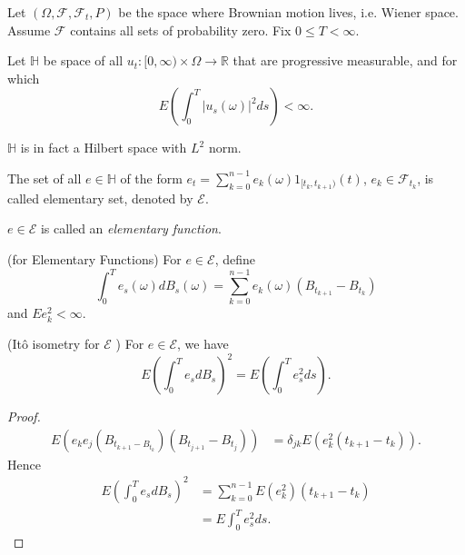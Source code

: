 \begin{definition}
	Let $(\Omega, \mathcal{F}, \mathcal{F}_t, P)$ be the space where Brownian motion lives, i.e. Wiener space. Assume $\mathcal{F}$ contains all sets of probability zero. Fix $0 \le  T < \infty $. 

	Let $\mathbb{H}$ be space of all $u_t : [0,\infty ) \times \Omega \to  \mathbb{R}$ that are progressive measurable, and for which
	\[
		E \left( \int _0^T |u_s(\omega)|^2 ds  \right) < \infty 
	.\] 
\end{definition}
$\mathbb{H}$ is in fact a Hilbert space with $L^2$ norm.

The set of all $e \in \mathbb{H}$ of the form $e_t = \sum_{k=0}^{n-1} e_k(\omega) 1_{[t_k, t_{k+1})}(t)$, $e_k \in \mathcal{F}_{t_k}$, is called elementary set, denoted by $\mathcal{E}$.

$e \in \mathcal{E}$ is called an \textit{elementary function}.

\begin{definition}(for Elementary Functions)
	For $e \in \mathcal{E}$, define
	\[
		\int _0^T e_s(\omega) d B_s(\omega)
		= \sum_{k=0}^{n-1} e_k(\omega) \left( B_{t_{k+1}} - B_{t_k} \right) 
	\] 
	and $E e_k^2 < \infty $.
\end{definition}

\begin{lemma}
	(Itô isometry for $\mathcal{E}$ )
	For $e \in \mathcal{E}$, we have
	\[
		E\left( \int _0^T e_s dB_s \right) ^2 = E\left( \int _0^T e_s^2 d s \right) 
	.\] 
\end{lemma}
\begin{proof}
	\begin{align*}
		E\left( e_k e_j \left( B_{t_{k+1} - B_{t_k}} \right) \left( B_{t_{j+1}} - B_{t_j} \right)  \right) 
		&= \delta_{jk } E\left( e_k^2 \left( t_{k+1} - t_k \right)  \right) 
	.\end{align*}
	Hence
	\begin{align*}
		E\left( \int _0^T e_s d B_s \right) ^2
		&= \sum_{k=0}^{n-1} E(e_k^2) \left( t_{k+1} - t_k \right)  \\
		&= E \int _0^T e_s^2 ds
	.\end{align*}
\end{proof}

